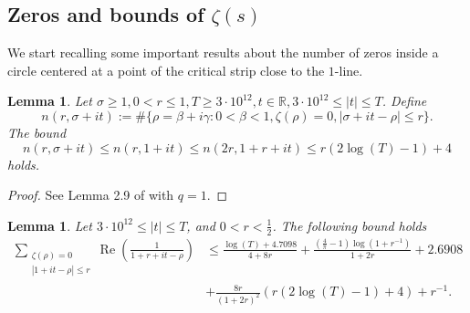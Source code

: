 \documentclass[reqno]{amsart}
\newtheorem{lemma}[theorem]{Lemma}
\numberwithin{equation}{section}
\theoremstyle{remark}
\begin{document}
\subsection{Zeros and bounds of $\zeta(s)$}

We start recalling some important results about the number of zeros inside a circle centered at a point of the critical strip close to the $1$-line.
\begin{lemma}\label{lemmangen}
  Let $\sigma \geq 1,0<r \leq 1, T\ge 3\cdot 10^{12} , t \in \mathbb{R},3\cdot 10^{12}\le|t| \leq T$. Define
$$
n(r, \sigma+i t):=\#\{\rho=\beta+i \gamma: 0<\beta<1, \zeta(\rho)=0,|\sigma+i t-\rho| \leq r\} .
$$
The bound $$n(r, \sigma+i t) \leq n(r, 1+i t) \leq n(2 r, 1+r+i t) \leq r(2 \log ( T)-1)+4$$ holds.
\end{lemma}
\begin{proof}
    See  Lemma 2.9 of \cite{thorner2023explicit} with $q=1$.
\end{proof}
\begin{lemma}\label{pr211q1}
Let $3\cdot 10^{12}\le |t| \leq T$, and $0<r<\frac{1}{2}$.  The following bound holds
$$
\begin{aligned}
\sum_{\substack{\zeta(\rho)=0 \\
|1+i t-\rho| \leq r}} \operatorname{Re}\left(\frac{1}{1+r+i t-\rho}\right) & \leq \frac{\log ( T)+4.7098}{4+8 r}+\frac{\left(\frac{4}{\pi}-1\right) \log \left(1+r^{-1}\right)}{1+2 r}+2.6908 \\
& +\frac{8 r}{(1+2 r)^2}(r(2 \log ( T)-1)+4)+r^{-1}.
\end{aligned}
$$
\end{lemma}
\end{document}
